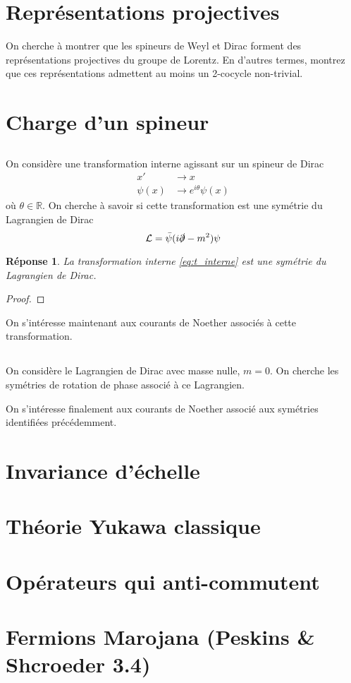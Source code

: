 \documentclass{article}
\numberwithin{equation}{section}
\theoremstyle{solution}
\newtheorem{solution}{Réponse}[section]
\begin{document}
\section{Représentations projectives}
On cherche à montrer que les spineurs de Weyl et Dirac forment des représentations projectives du groupe
de Lorentz. 
En d’autres termes, montrez que ces représentations admettent au moins un 2-cocycle non-trivial.

\section{Charge d’un spineur}
\subsection{}
On considère une transformation interne agissant sur un spineur de Dirac
\begin{equation}\label{eq:t_interne}
	\begin{split}
		x' &\rightarrow  x \\
		\psi(x) &\rightarrow e^{i\theta}\psi(x)
	\end{split}
\end{equation} 
où $\theta \in \mathbb{R}$. On cherche à savoir si cette transformation est une symétrie du Lagrangien de Dirac
\begin{equation}\label{eq:dirac_L}
	\mathcal{L} = \bar{\psi}(i \slashed{\partial} - m^{2})\psi
\end{equation} 

\begin{solution}
	La transformation interne \eqref{eq:t_interne} est une symétrie du Lagrangien de Dirac.	
\end{solution}
\begin{proof}
	
\end{proof}

\noindent
On s'intéresse maintenant aux courants de Noether associés à cette transformation.

\subsection{}
On considère le Lagrangien de Dirac avec masse nulle, $m = 0$. On cherche les symétries de rotation de phase associé à ce Lagrangien.

\noindent
On s'intéresse finalement aux courants de Noether associé aux symétries identifiées précédemment.

\section{Invariance d’échelle}

\section{Théorie Yukawa classique}

\section{Opérateurs qui anti-commutent}

\section{Fermions Marojana (Peskins \& Shcroeder 3.4)}
\end{document}
